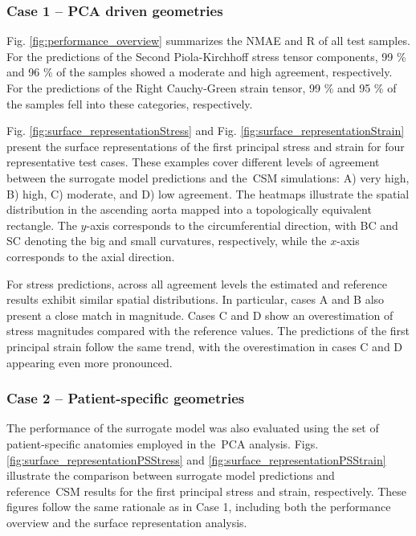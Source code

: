 \documentclass[a4paper,fleqn]{cas-sc}
\begin{document}
  \subsubsection{Case 1 -- PCA driven geometries}
    Fig. \ref{fig:performance_overview} summarizes the NMAE and R of all test samples. For the predictions of the Second Piola-Kirchhoff stress tensor components, 99 \% and 96 \% of the samples showed a moderate and high agreement, respectively. For the predictions of the Right Cauchy-Green strain tensor, 99 \% and 95 \% of the samples fell into these categories, respectively.

    Fig. \ref{fig:surface_representationStress} and Fig. \ref{fig:surface_representationStrain} present the surface representations of the first principal stress and strain for four representative test cases. These examples cover different levels of agreement between the surrogate model predictions and the~\gls{CSM} simulations: A) very high, B) high, C) moderate, and D) low agreement. The heatmaps illustrate the spatial distribution in the ascending aorta mapped into a topologically equivalent rectangle. The $y$-axis corresponds to the circumferential direction, with BC and SC denoting the big and small curvatures, respectively, while the $x$-axis corresponds to the axial direction.
     
    For stress predictions, across all agreement levels the estimated and reference results exhibit similar spatial distributions. In particular, cases A and B also present a close match in magnitude. Cases C and D show an overestimation of stress magnitudes compared with the reference values. The predictions of the first principal strain follow the same trend, with the overestimation in cases C and D appearing even more pronounced.

  \subsubsection{Case 2 -- Patient-specific geometries}
    The performance of the surrogate model was also evaluated using the set of patient-specific anatomies employed in the~\gls{PCA} analysis. Figs. \ref{fig:surface_representationPSStress} and \ref{fig:surface_representationPSStrain} illustrate the comparison between surrogate model predictions and reference~\gls{CSM} results for the first principal stress and strain, respectively. These figures follow the same rationale as in Case 1, including both the performance overview and the surface representation analysis. 
\end{document}
